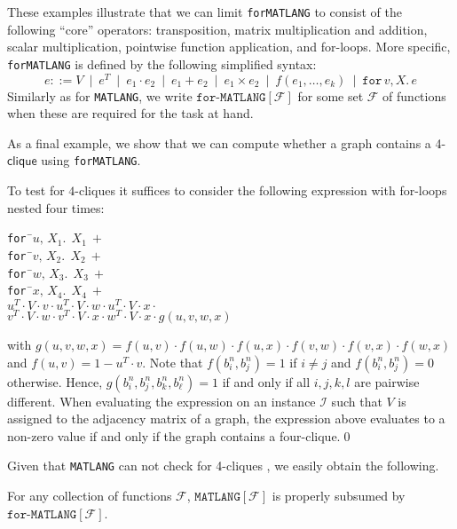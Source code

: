 \documentclass[sigconf]{acmart}
\newcommand{\Fun}{\mathcal{F}}
\newcommand{\I}{\mathcal{I}}
\newcommand{\lang}{\texttt{MATLANG}\xspace}
\newcommand{\langf}[1]{\texttt{MATLANG}[#1]}
\newcommand{\langfor}{\texttt{for}\text{-}\texttt{MATLANG}\xspace}
\newcommand{\langforf}[1]{\texttt{for}\text{-}\texttt{MATLANG}[#1]\xspace}
\newcommand{\ffor}[3]{\texttt{for}\, #1,#2 \texttt{.}\, #3}
\begin{document}
These examples illustrate that we can limit \langfor to consist of the following ``core'' operators: transposition, matrix multiplication and addition, scalar multiplication, pointwise function application, and for-loops. More specific, \langfor is defined by the following simplified syntax:
$$
e ::= V \ \mid \ e^T \!\ \mid \ e_1 \cdot e_2 \ \mid \ e_1 + e_2 \ \mid \ e_1\times e_2  \ \mid \  f(e_1,\ldots ,e_k) \ \mid \ \ffor{v}{X}{e}
$$
Similarly as for \lang, we write $\langforf{\Fun}$ for some set $\Fun$ of functions when these are required for the task at hand.

As a final example, we show that we can compute whether a graph contains a 4-$\textsf{clique}$ using \langfor.
\begin{example}\label{ex:fourcliques}
To test for $4$-cliques it suffices to consider the following expression with for-loops nested four times:
\begin{tabbing}
\texttt{for\,}\=$u,\,X_1.\ \ X_1 \ + $\\
\> \texttt{for\,}\=$v,\,X_2.\ \ X_2 \ +$ \\
\>\>\texttt{for\,}\=$w,\,X_3.\ \ X_3 \ +$ \\
\>\>\>\texttt{for\,}\=$x,\,X_4.\ \ X_4 \ +$ \\
\>\>\>\>$u^T\cdot V\cdot v \cdot u^T\cdot V\cdot w\cdot u^T\cdot V\cdot x \cdot $\\
\>\>\>\>$v^T\cdot V\cdot w \cdot v^T\cdot V\cdot x\cdot w^T\cdot V\cdot x \cdot g(u,v,w,x)$
\end{tabbing}
with $g(u,v,w,x)=f(u,v)\cdot f(u,w)\cdot f(u,x)\cdot f(v,w)\cdot f(v,x)\cdot f(w,x)$ and
$f(u,v)=1-u^T\cdot v$. Note that $f(b_i^n,b_j^n)=1$ if $i\neq j$ and $f(b_i^n,b_j^n)=0$ otherwise.
Hence, $g(b_i^n,b_j^n,b_k^n,b_\ell^n)=1$ if and only if all $i,j,k,l$ are pairwise different.
When evaluating the expression on an instance $\I$ such that $V$ is assigned to the adjacency 
matrix of a graph, the expression above evaluates to a non-zero value if and only if the graph
contains a four-clique.\qed
\end{example}

Given that \lang can not check for 4-cliques \cite{matlang-journal}, we easily obtain the following.

\begin{proposition}
\label{cor-ml-fml}
For any collection of functions $\Fun$, 
$\langf{\Fun}$ is properly subsumed by $\langforf{\Fun}$.
\end{proposition} 
\end{document}
